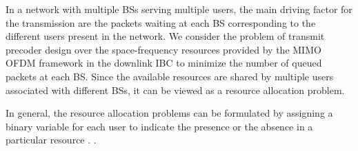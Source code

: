 

In a network with multiple \acp{BS} serving multiple users, the main driving factor for the transmission are the packets waiting at each \ac{BS} corresponding to the different users present in the network. We consider the problem of transmit precoder design over the space-frequency resources provided by the \ac{MIMO} \ac{OFDM} framework in the downlink \ac{IBC} to minimize the number of queued packets at each \ac{BS}. Since the available resources are shared by multiple users associated with different \acp{BS}, it can be viewed as a resource allocation problem.

In general, the resource allocation problems can be formulated by assigning a binary variable for each user to indicate the presence or the absence in a particular resource \cite{admission_control}. .


